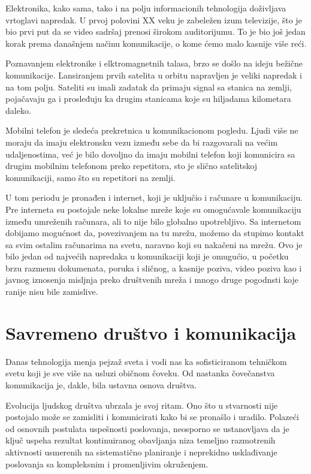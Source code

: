 \documentclass[10pt]{article}
\begin{document}
	Elektronika, kako sama, tako i na polju informacionih tehnologija doživljava vrtoglavi napredak. U prvoj polovini XX veku je zabeležen izum televizije, što je bio prvi put da se video sadršaj prenosi širokom auditorijumu. To je bio još jedan korak prema današnjem načinu komunikacije, o kome ćemo malo kasnije više reći.
	
	Poznavanjem elektronike i elktromagnetnih talasa, brzo se došlo na ideju bežične komunikacije. Lansiranjem prvih satelita u orbitu napravljen je veliki napredak i na tom polju. Sateliti su imali zadatak da primaju signal sa stanica na zemlji, pojačavaju ga i prosleđuju ka drugim stanicama koje su hiljadama kilometara daleko. 
	
	Mobilni telefon je sledeća prekretnica u komunikacionom pogledu. Ljudi više ne moraju da imaju elektronsku vezu između sebe da bi razgovarali na većim udaljenostima, već je bilo dovoljno da imaju mobilni telefon koji komunicira sa drugim mobilnim telefonom preko repetitora, sto je slično satelitskoj komunikaciji, samo što su repetitori na zemlji. 
	
	U tom periodu je pronađen i internet, koji je uključio i računare u komunikaciju. Pre interneta su postojale neke lokalne mreže koje su omogućavale komunikaciju između umreženih računara, ali to nije bilo globalno upotrebljivo. Sa internetom dobijamo mogućnost da, povezivanjem na tu mrežu, možemo da stupimo kontakt sa svim ostalim računarima na svetu, naravno koji su nakačeni na mrežu. Ovo je bilo jedan od najvećih napredaka u komunikaciji koji je omugućio, u početku brzu razmenu dokumenata, poruka i sličnog, a kasnije poziva, video poziva kao i javnog iznosenja misljnja preko društvenih mreža i mnogo druge pogodnsti koje ranije nisu bile zamislive.

   
    \section{Savremeno društvo i komunikacija}
    
    
	Danas tehnologija menja pejzaž sveta i vodi nas ka sofisticiranom tehničkom svetu koji je sve više na usluzi običnom čoveku. Od nastanka čovečanstva komunikacija je, dakle, bila ustavna osnova društva.
	
	Evolucija ljudskog društva ubrzala je svoj ritam. Ono što u stvarnosti nije postojalo može se zamisliti i komunicirati kako bi se pronašlo i uradilo. Polazeći od osnovnih postulata uspešnosti poslovanja, neosporno se ustanovljava da je ključ uspeha rezultat kontinuiranog obavljanja niza temeljno razmotrenih aktivnosti usmerenih na sistematično planiranje i neprekidno usklađivanje poslovanja sa kompleksnim i promenljivim okruženjem. 
	
\end{document}
